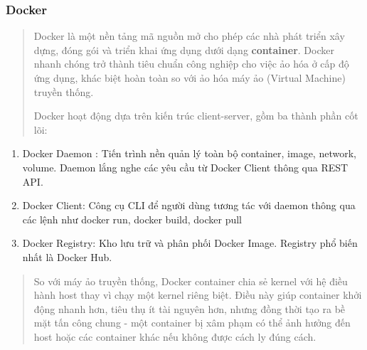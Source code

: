 \subsubsection{Docker}\label{docker}

\begin{quote}
Docker là một nền tảng mã nguồn mở cho phép các nhà phát triển xây dựng, đóng gói và triển khai ứng dụng dưới dạng \textbf{container}. Docker nhanh chóng trở thành tiêu chuẩn công nghiệp cho việc ảo hóa ở cấp độ ứng dụng, khác biệt hoàn toàn so với ảo hóa máy ảo (Virtual Machine) truyền thống.

Docker hoạt động dựa trên kiến trúc client-server, gồm ba thành phần cốt lõi:
\end{quote}

\begin{enumerate}
\def\labelenumi{(\arabic{enumi})}
\item
  Docker Daemon : Tiến trình nền quản lý toàn bộ container, image, network, volume. Daemon lắng nghe các yêu cầu từ Docker Client thông qua REST API.
\item
  Docker Client: Công cụ CLI để người dùng tương tác với daemon thông qua các lệnh như docker run, docker build, docker pull
\item
  Docker Registry: Kho lưu trữ và phân phối Docker Image. Registry phổ biến nhất là Docker Hub.
\end{enumerate}

\begin{quote}
So với máy ảo truyền thống, Docker container chia sẻ kernel với hệ điều hành host thay vì chạy một kernel riêng biệt. Điều này giúp container khởi động nhanh hơn, tiêu thụ ít tài nguyên hơn, nhưng đồng thời tạo ra bề mặt tấn công chung - một container bị xâm phạm có thể ảnh hưởng đến host hoặc các container khác nếu không được cách ly đúng cách.
\end{quote}

